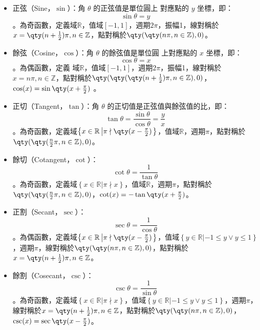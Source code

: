 \documentclass[a4paper,12pt]{report}
\begin{document}
\begin{itemize}
  \item 正弦（Sine，$\sin$）：角 \(\theta\) 的正弦值是單位圓上 對應點的 \(y\) 坐標，即：\[\sin \theta = y\]。為奇函數，定義域$\mathbb{R}$，值域$[-1,1]$，週期$2\pi$，振幅1，線對稱於$x=\qty(n+\frac{1}{2})\pi,n\in\mathbb{Z}$，點對稱於$\qty(\qty(n\pi,n\in\mathbb{Z}),0)$。
  \item 餘弦（Cosine，$\cos$）：角 \(\theta\) 的餘弦值是單位圓 上對應點的 \(x\) 坐標，即：\[\cos \theta = x\]。為偶函數，定義 域$\mathbb{R}$，值域$[-1,1]$，週期$2\pi$，振幅1，線對稱於$x=n\pi,n\in\mathbb{Z}$，點對稱於$\qty(\qty(\qty(n+\frac{1}{2})\pi,n\in\mathbb{Z}),0)$，$\cos(x)=\sin\qty(x+\frac{\pi}{2})$ 。
  \item 正切（Tangent，$\tan$）：角 \(\theta\) 的正切值是正弦值與餘弦值的比，即：\[\tan \theta = \frac{\sin \theta}{\cos \theta} = \frac{y}{x}\]。為奇函數，定義域$\left\{x\in\mathbb{R}\left |\pi\nmid\qty(x-\frac{\pi}{2})\right.\right\}$，值域$\mathbb{R}$，週期$\pi$，點對稱於$\qty(\qty(\frac{n}{2}\pi,n\in\mathbb{Z}),0)$。
  \item 餘切（Cotangent，$\cot$）：\[\cot \theta = \frac{1}{\tan \theta}\]。為奇函數，定義域$\left\{x\in\mathbb{R}\left |\pi\nmid x\right.\right\}$，值域$\mathbb{R}$，週期$\pi$，點對稱於$\qty(\qty(\frac{n}{2}\pi,n\in\mathbb{Z}),0)$，$\cot(x)=-\tan\qty(x+\frac{\pi}{2})$。
  \item 正割（Secant，$\sec$）：\[\sec \theta = \frac{1}{\cos \theta}\]。為偶函數，定義域$\left\{x\in\mathbb{R}\left |\pi\nmid\qty(x-\frac{\pi}{2})\right.\right\}$，值域$\left\{y\in\mathbb{R}\left |-1\leq y \lor y\leq 1\right.\right\}$，週期$\pi$，線對稱於$\qty(\qty(n\pi,n\in\mathbb{Z}),0)$，點對稱於$x=\qty(n+\frac{1}{2})\pi,n\in\mathbb{Z}$。
  \item 餘割（Cosecant，$\csc$）：\[\csc \theta = \frac{1}{\sin \theta}\]。為奇函數，定義域$\left\{x\in\mathbb{R}\left |\pi\nmid x\right.\right\}$，值域$\left\{y\in\mathbb{R}\left |-1\leq y \lor y\leq 1\right.\right\}$，週期$\pi$，線對稱於$x=\qty(n+\frac{1}{2})\pi,n\in\mathbb{Z}$，點對稱於$\qty(\qty(n\pi,n\in\mathbb{Z}),0)$，$\csc(x)=\sec\qty(x-\frac{\pi}{2})$。
\end{itemize}
\renewcommand{\arraystretch}{1.5}
\end{document}
